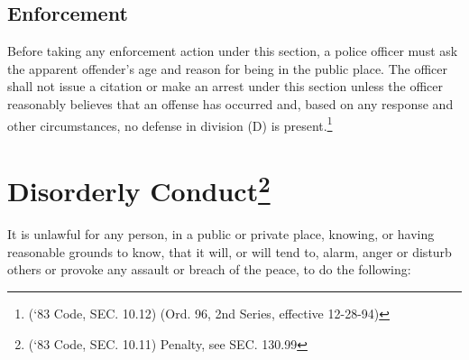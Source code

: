 \subsection{Enforcement}  Before taking any enforcement action under this section, a police officer must ask the apparent offender’s age and reason for being in the public place.  The officer shall not issue a citation or make an arrest under this section unless the officer reasonably believes that an offense has occurred and, based on any response and other circumstances, no defense in division (D) is present.\footnote{(‘83 Code, SEC. 10.12)  (Ord. 96, 2nd Series, effective 12-28-94)}
\section{Disorderly Conduct\footnote{(‘83 Code, SEC. 10.11)  Penalty, see SEC. 130.99}}
It is unlawful for any person, in a public or private place, knowing, or having reasonable grounds to know, that it will, or will tend to, alarm, anger or disturb others or provoke any assault or breach of the peace, to do the following:
